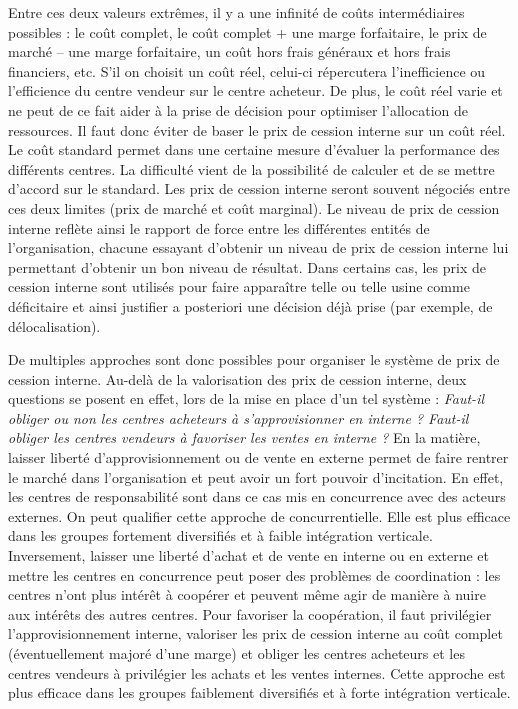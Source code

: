 \documentclass[oneside]{kaobook}
\begin{document}
Entre ces deux valeurs extrêmes, il y a une infinité de coûts intermédiaires possibles : le coût complet, le coût complet + une marge forfaitaire, le prix de marché – une marge forfaitaire, un coût hors frais généraux et hors frais financiers, etc.
S’il on choisit un coût réel, celui-ci répercutera l’inefficience ou l’efficience du centre vendeur sur le centre acheteur. De plus, le coût réel varie et ne peut de ce fait aider à la prise de décision pour optimiser l’allocation de ressources. Il faut donc éviter de baser le prix de cession interne sur un coût réel.
Le coût standard permet dans une certaine mesure d’évaluer la performance des différents centres. La difficulté vient de la possibilité de calculer et de se mettre d’accord sur le standard.
Les prix de cession interne seront souvent négociés entre ces deux limites (prix de marché et coût marginal). Le niveau de prix de cession interne reflète ainsi le rapport de force entre les différentes entités de l’organisation, chacune essayant d’obtenir un niveau de prix de cession interne lui permettant d’obtenir un bon niveau de résultat. Dans certains cas, les prix de cession interne sont utilisés pour faire apparaître telle ou telle usine comme déficitaire et ainsi justifier a posteriori une décision déjà prise (par exemple, de délocalisation).

De multiples approches sont donc possibles pour organiser le système de prix de cession interne. Au-delà de la valorisation des prix de cession interne, deux questions se posent en effet, lors de la mise en place d’un tel système : \emph{Faut-il obliger ou non les centres acheteurs à s’approvisionner en interne ? Faut-il obliger les centres vendeurs à favoriser les ventes en interne ?}
En la matière, laisser liberté d’approvisionnement ou de vente en externe permet de faire rentrer le marché dans l’organisation et peut avoir un fort pouvoir d’incitation. En effet, les centres de responsabilité sont dans ce cas mis en concurrence avec des acteurs externes. On peut qualifier cette approche de concurrentielle. Elle est plus efficace dans les groupes fortement diversifiés et à faible intégration verticale.
Inversement, laisser une liberté d’achat et de vente en interne ou en externe et mettre les centres en concurrence peut poser des problèmes de coordination : les centres n’ont plus intérêt à coopérer et peuvent même agir de manière à nuire aux intérêts des autres centres. Pour favoriser la coopération, il faut privilégier l’approvisionnement interne, valoriser les prix de cession interne au coût complet (éventuellement majoré d'une marge) et obliger les centres acheteurs et les centres vendeurs à privilégier les achats et les ventes internes. Cette approche est plus efficace dans les groupes faiblement diversifiés et à forte intégration verticale.
\end{document}
